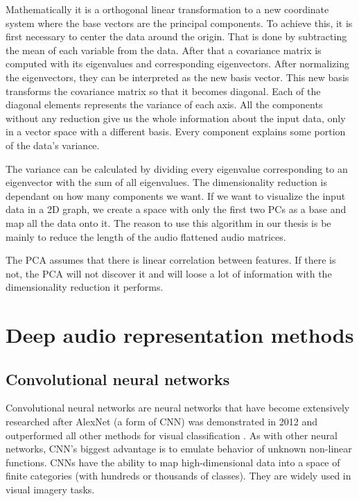 Mathematically it is a orthogonal linear transformation to a new coordinate system where the base vectors are the principal components. To achieve this, it is first necessary to center the data around the origin. That is done by subtracting the mean of each variable from the data. After that a covariance matrix is computed with its eigenvalues and corresponding eigenvectors. After normalizing the eigenvectors, they can be interpreted as the new basis vector. This new basis transforms the covariance matrix so that it becomes diagonal. Each of the diagonal elements represents the variance of each axis. All the components without any reduction give us the whole information about the input data, only in a vector space with a different basis. Every component explains some portion of the data's variance. 

The variance can be calculated by dividing every eigenvalue corresponding to an eigenvector with the sum of all eigenvalues. The dimensionality reduction is dependant on how many components we want. If we want to visualize the input data in a 2D graph, we create a space with only the first two PCs as a base and map all the data onto it. The reason to use this algorithm in our thesis is be mainly to reduce the length of the audio flattened audio matrices. 

The PCA assumes that there is linear correlation between features. If there is not, the PCA will not discover it and will loose a lot of information with the dimensionality reduction it performs.

\section{Deep audio representation methods}\label{sec:audio_deep_learning}

\subsection{Convolutional neural networks}
Convolutional neural networks are neural networks that have become extensively researched after AlexNet (a form of CNN) was demonstrated in 2012 and outperformed all other methods for visual classification \cite{Krizhevsky:2012:ICD:2999134.2999257}. As with other neural networks, CNN's biggest advantage is to emulate behavior of unknown non-linear functions. CNNs have the ability to map high-dimensional data into a space of finite categories (with hundreds or thousands of classes). They are widely used in visual imagery tasks. 

